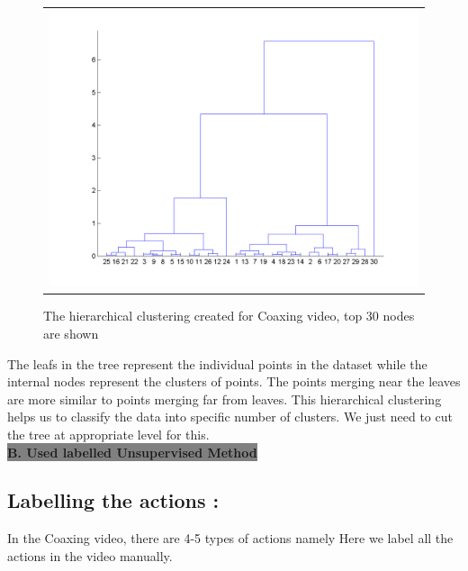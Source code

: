 \documentclass[a4paper, 10pt, notitlepage]{report}
\begin{document}
\begin{figure}[h]
\center
\begin{tabular}{c}
\includegraphics[scale=0.30]{dendoCoax.png}
\end{tabular}
\label{tab:gt}
\caption{The hierarchical clustering created for Coaxing video, top 30 nodes are shown}
\end{figure} 
 
 The leafs in the tree represent the individual points in the dataset while the internal nodes represent the clusters of points. The points merging near the leaves are more similar to points merging far from leaves. This hierarchical clustering helps us to classify the data into specific number of clusters. We just need to cut the tree at appropriate level for this.\\
 
 \colorbox{gray}{\Large \bf B. Used labelled Unsupervised Method}

\subsection{Labelling the actions :}
In the Coaxing video, there are 4-5 types of actions namely Here we label all the actions in the video manually. 
 
 
 
 
 
\appendix
\end{document}
